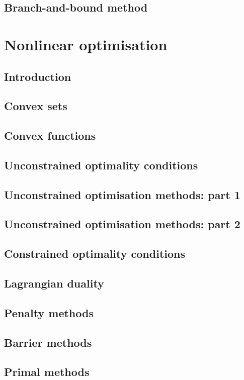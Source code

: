 \documentclass{bookest}
\begin{document}
	\chapter{Branch-and-bound method} \label{chapter_9}
	
	
	
	
	
	\part{Nonlinear optimisation} \label{part_2}
		
	\chapter{Introduction}
	
	
	\chapter{Convex sets}
	
	
	\chapter{Convex functions}
	
	
	\chapter{Unconstrained optimality conditions}
	
	
	\chapter{Unconstrained optimisation methods: part 1}
	
	
	\chapter{Unconstrained optimisation methods: part 2}
	
	
	\chapter{Constrained optimality conditions}
		
	
	\chapter{Lagrangian duality}
		
	
	\chapter{Penalty methods}
	
	
	\chapter{Barrier methods}
	
	
	\chapter{Primal methods}
	
	
\end{document}
